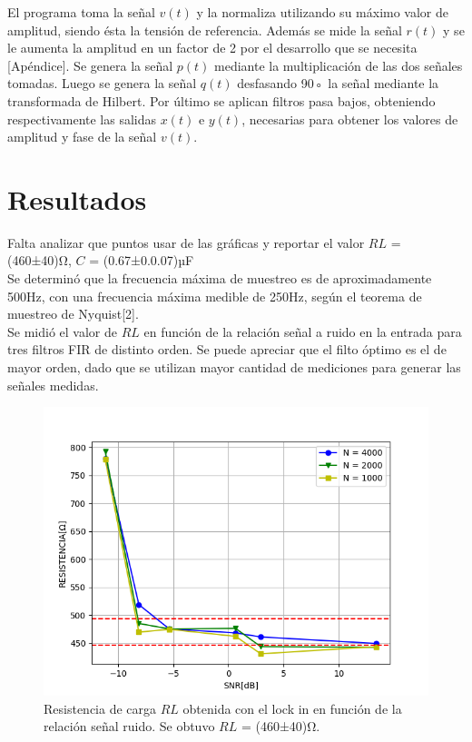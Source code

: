 \documentclass[11pt,a4paper]{extarticle}
\begin{document}
\begin{multicols}{2}
El programa toma la señal $v(t)$
y la normaliza utilizando su máximo valor de amplitud,
 siendo ésta la tensión de referencia. Además se mide 
 la señal $r(t)$ y se le aumenta la amplitud en un factor
 de 2 por el desarrollo que se necesita [Apéndice].
Se genera la señal $p(t)$ mediante la multiplicación de 
las dos señales tomadas.
Luego se genera la señal $q(t)$ desfasando 90◦
la señal 
mediante la transformada de Hilbert.
Por último se aplican filtros pasa bajos,
 obteniendo respectivamente las salidas $x(t)$ e $y(t)$,
  necesarias para obtener los
valores de amplitud y fase de la señal $v(t)$.


\section{Resultados}

Falta analizar que puntos usar de las gráficas y reportar
el valor $RL$ = (460±40)Ω, $C$ = (0.67±0.0.07)µF\\

Se determinó que la frecuencia máxima de muestreo es 
de aproximadamente 
500Hz, con una frecuencia máxima medible de 250Hz, 
según el teorema de muestreo de Nyquist[2].\\

Se midió el valor de $RL$ en función 
de la relación señal a ruido en la entrada para tres 
filtros FIR de distinto orden.
Se puede apreciar que el filto óptimo es el de mayor 
orden, dado que se utilizan mayor cantidad de 
mediciones para generar las señales medidas.

\begin{figure}[H]
	\centering
	\includegraphics[width=\linewidth]{Images/RvsSNR(segunda).png}
	\caption{Resistencia de carga $RL$ obtenida con 
	el lock in en función
	de la relación señal ruido. Se obtuvo 
	$RL$ = (460±40)Ω.}
	\label{fig:RvsSNR}
\end{figure}


\end{multicols}
\end{document}
